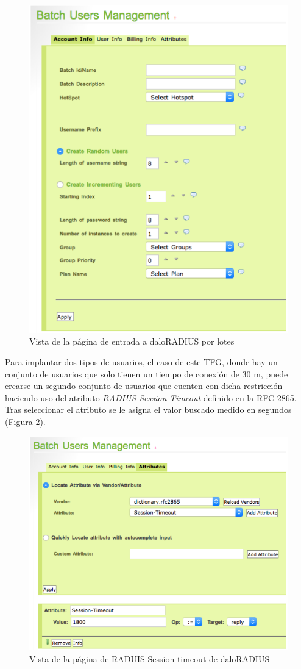 \begin{figure}[!t]
\begin{center}
\includegraphics[width=0.75\linewidth]{./5_AnalisisOrganico/Img/daloBatchUsers.png}
\end{center}
\caption{Vista de la página de entrada a daloRADIUS por lotes}
\label{daloBatchUsers}
\end{figure}

Para implantar dos tipos de usuarios, el caso de este TFG, donde hay un conjunto de usuarios que solo tienen un tiempo de conexión de 30 m, puede crearse un segundo conjunto de usuarios que cuenten con dicha restricción haciendo uso del atributo \emph{RADIUS Session-Timeout} definido en la RFC 2865. Tras seleccionar el atributo se le asigna el valor buscado medido en segundos (Figura \ref{daloBatchUsersMan}).

\begin{figure}[!t]
\begin{center}
\includegraphics[width=0.75\linewidth]{./5_AnalisisOrganico/Img/daloBatchUsersMan.png}
\end{center}
\caption{Vista de la página de RADUIS Session-timeout de daloRADIUS}
\label{daloBatchUsersMan}
\end{figure}

